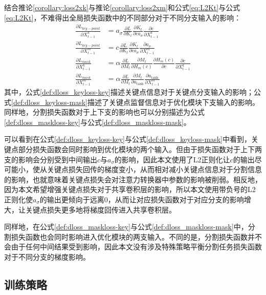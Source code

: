 结合推论\ref{corollary:loss2xk}与推论\ref{corollary:loss2xm}和公式\eqref{eq:L2Kt}与公式\eqref{eq:L2Kt}，不难得出全局损失函数中的不同部分对于不同分支输入的影响：
\begin{align}
\frac{\partial L_{key-point}}{\partial X^k_{t-1}} &= a_{\sigma}\frac{\partial L}{\partial K_t}\frac{\partial K_t}{\partial ca_{\sigma}}\frac{\partial c}{\partial X_{t-1}^k}\label{def:dloss_keyloss-key}\\
\frac{\partial L_{key-point}}{\partial X^m_{t-1}} &= c\frac{\partial L}{\partial K_t}\frac{\partial K_t}{\partial ca_{\sigma}}\frac{\partial a_{\sigma}}{\partial X^m_{t-1}}\label{def:dloss_keyloss-mask}\\
\frac{\partial L_{mask}}{\partial X^k_{t-1}} &= \alpha\frac{\partial L}{\partial M_t}\frac{\partial M_t}{\partial H_m(c)}\frac{\partial H_m(c)}{\partial c}\frac{\partial c}{\partial X_{t-1}^k}\label{def:dloss_maskloss-key}\\
\frac{\partial L_{mask}}{\partial X^m_{t-1}} &= \alpha\frac{\partial L}{\partial M_t}\frac{\partial M_t}{\partial a_{\tanh}}\frac{\partial a_{\tanh}}{\partial X^m_{t-1}}\label{def:dloss_maskloss-mask}
\end{align}
其中，公式\eqref{def:dloss_keyloss-key}描述关键点信息对于关键点分支输入的影响；公式\eqref{def:dloss_keyloss-mask}描述了关键点监督信息对于优化模块下支输入的影响。同样地，分割损失函数对于上下支的影响也可以分别描述为公式\eqref{def:dloss_maskloss-key}与公式\eqref{def:dloss_maskloss-mask}。

可以看到在公式\eqref{def:dloss_keyloss-key}与公式\eqref{def:dloss_keyloss-mask}中看到，关键点部分损失函数会同时影响到优化模块的两个输入。但由于损失函数对于上下两支的影响会分别受到中间输出$c$与$a_{\sigma}$的影响，因此本文使用了L2正则化让$c$的输出尽可能小，使从关键点损失回传的梯度变小，从而相对减小关键点信息对于分割信息的影响，也就意味着关键点损失会对注意力转换器中参数的影响被削弱。相反地，因为本文希望增强关键点损失对于共享卷积层的影响，所以本文使用带负号的L2正则化使$a_{\sigma}$的输出更倾向于远离0，从而让对应损失函数对于对应分支的影响增大，让关键点损失更多地将梯度回传进入共享卷积层。

同样地，在公式\eqref{def:dloss_maskloss-key}与公式\eqref{def:dloss_maskloss-mask}中，分割损失函数也会同时影响进入优化模块的两支输入。不同的是，分割损失函数并不会由于任何中间结果受到影响，因此本文没有涉及特殊策略平衡分割任务损失函数对于不同分支的梯度影响。


\subsection{训练策略}
\label{subsec:trainingstrategy}

